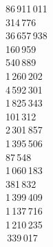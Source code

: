 86 911 011 \\
314 776 \\
36 657 938 \\
160 959 \\
540 889 \\
1 260 202 \\
4 592 301 \\
1 825 343 \\
101 312 \\
2 301 857 \\
1 395 506 \\
87 548 \\
1 060 183 \\
381 832 \\
1 399 409 \\
1 137 716 \\
1 210 235 \\
 339 017 \\
